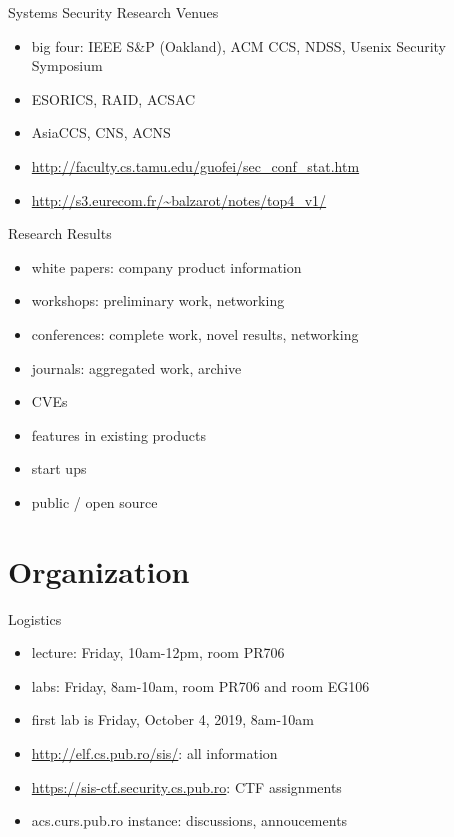 \documentclass{curs}
\begin{document}
\begin{frame}{Systems Security Research Venues}
  \begin{itemize}
    \pause \item big four: IEEE S\&P (Oakland), ACM CCS, NDSS, Usenix Security Symposium
    \pause \item ESORICS, RAID, ACSAC
    \pause \item AsiaCCS, CNS, ACNS
    \pause \item \url{http://faculty.cs.tamu.edu/guofei/sec_conf_stat.htm}
    \pause \item \url{http://s3.eurecom.fr/~balzarot/notes/top4_v1/}
  \end{itemize}
\end{frame}

\begin{frame}{Research Results}
  \begin{itemize}
    \pause \item white papers: company product information
    \pause \item workshops: preliminary work, networking
    \pause \item conferences: complete work, novel results, networking
    \pause \item journals: aggregated work, archive
    \pause \item CVEs
    \pause \item features in existing products
    \pause \item start ups
    \pause \item public / open source
  \end{itemize}
\end{frame}

\section{Organization}

\begin{frame}{Logistics}
  \begin{itemize}
    \item lecture: Friday, 10am-12pm, room PR706
    \item labs: Friday, 8am-10am, room PR706 and room EG106
    \item first lab is Friday, October 4, 2019, 8am-10am
    \item \url{http://elf.cs.pub.ro/sis/}: all information
    \item \url{https://sis-ctf.security.cs.pub.ro}: CTF assignments
    \item acs.curs.pub.ro instance: discussions, annoucements
  \end{itemize}
\end{frame}
\end{document}
